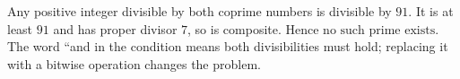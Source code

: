 Any positive integer divisible by both coprime numbers is divisible by $91$. It is at least $91$ and has proper divisor $7$, so is composite. Hence $\boxed{\text{no such prime exists}}$. The word ``and in the condition means both divisibilities must hold; replacing it with a bitwise operation changes the problem.
